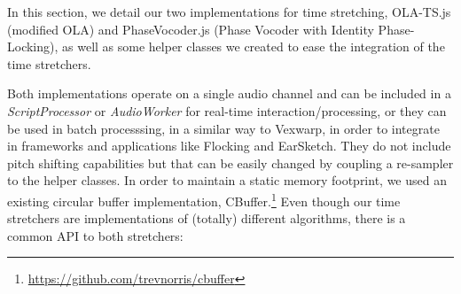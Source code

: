 \documentclass{sig-alternate}
\begin{document}
\begin{sloppypar}
In this section, we detail our two implementations for time stretching, OLA-TS.js (modified OLA) and PhaseVocoder.js (Phase Vocoder with Identity Phase-Locking), as well as some helper classes we created to ease the integration of the time stretchers. 

Both implementations operate on a single audio channel and can be included in a \textit{ScriptProcessor} or \textit{AudioWorker} for real-time interaction/processing, or they can be used in batch processsing, in a similar way to Vexwarp, in order to integrate in frameworks and applications like Flocking and EarSketch. They do not include pitch shifting capabilities but that can be easily changed by coupling a re-sampler to the helper classes. In order to maintain a static memory footprint, we used an existing circular buffer implementation, CBuffer.\footnote{\url{https://github.com/trevnorris/cbuffer}} Even though our time stretchers are implementations of (totally) different algorithms, there is a common API to both stretchers:


\end{sloppypar}
\end{document}
